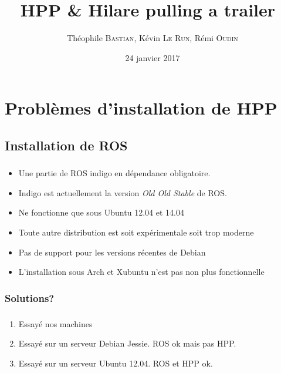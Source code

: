 \documentclass[11pt]{beamer}
\author{Théophile \textsc{Bastian}, Kévin \textsc{Le Run}, Rémi \textsc{Oudin}}
\title{HPP \& \og{}Hilare pulling a trailer~\fg}
\date{24 janvier 2017}
\begin{document}
\begin{frame}
	\titlepage{}
	\tableofcontents
\end{frame}


\section{Problèmes d'installation de HPP}

\subsection{Installation de ROS}

\begin{frame}
    \frametitle{\subsecname}
    \begin{itemize}
        \item Une partie de ROS indigo en dépendance obligatoire.
        \item Indigo est actuellement la version \emph{Old Old Stable} de ROS\@.
        \item Ne fonctionne que sous Ubuntu 12.04 et 14.04
        \item Toute autre distribution est soit expérimentale soit trop moderne
        \item Pas de support pour les versions récentes de Debian
        \item L'installation sous Arch et Xubuntu n'est pas non plus
            fonctionnelle
    \end{itemize}
\end{frame}

\subsubsection{Solutions?}

\begin{frame}
    \frametitle{\subsecname}
    \begin{enumerate}
        \item Essayé nos machines
        \item Essayé sur un serveur Debian Jessie. ROS ok mais pas HPP\@.
        \item Essayé sur un serveur Ubuntu 12.04. ROS et HPP ok.
    \end{enumerate}
\end{frame}
\end{document}
